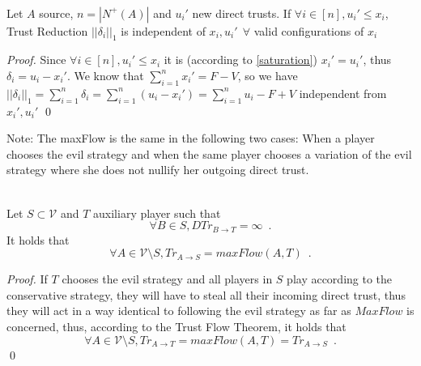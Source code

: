 \documentclass[11pt]{llncs}
\begin{document}
    \begin{theorem} \ \\
       \label{invariability}
       Let $A$ source, $n = |N^{+}(A)|$ and $u_i'$ new direct trusts. If $\forall i \in [n],u_i' \leq x_i$,
       Trust Reduction $||\delta_i||_1$ is independent of $x_i, u_i' \:\: \forall$ valid configurations of $x_i$
    \end{theorem}
    \begin{proof} 
       Since $\forall i \in [n],u_i' \leq x_i$ it is (according to \ref{saturation}) $x_i' = u_i'$, thus
       $\delta_i = u_i - x_i'$. We know that $\sum\limits_{i=1}^{n}x_i' = F - V$, so we have $||\delta_i||_1 =
       \sum\limits_{i=1}^{n}\delta_i = \sum\limits_{i=1}^{n}(u_i - x_i') = \sum\limits_{i=1}^{n}u_i - F + V$ independent
       from $x_i', u_i'$ \qed
    \end{proof}

    Note: The maxFlow is the same in the following two cases: When a player chooses the evil strategy and when the same
    player chooses a variation of the evil strategy where she does not nullify her outgoing direct trust.
    \begin{theorem} \ \\
       \label{trustmany}
       Let $S \subset \mathcal{V}$ and $T$ auxiliary player such that
       \begin{equation}
          \forall B \in S, DTr_{B \rightarrow T} = \infty \enspace.
       \end{equation}
       It holds that
       \begin{equation}
          \forall A \in \mathcal{V} \setminus S, Tr_{A \rightarrow S} = maxFlow\left(A, T\right) \enspace.
       \end{equation}
    \end{theorem}       
    \begin{proof}
       If $T$ chooses the evil strategy and all players in $S$ play according to the conservative strategy, they will have to
       steal all their incoming direct trust, thus they will act in a way identical to following the evil strategy as far as
       $MaxFlow$ is concerned, thus, according to the Trust Flow Theorem, it holds that
       \begin{equation}
          \forall A \in \mathcal{V} \setminus S, Tr_{A \rightarrow T} = maxFlow\left(A, T\right) = Tr_{A \rightarrow S}
          \enspace.
       \end{equation}
       \qed
    \end{proof}
\end{document}

